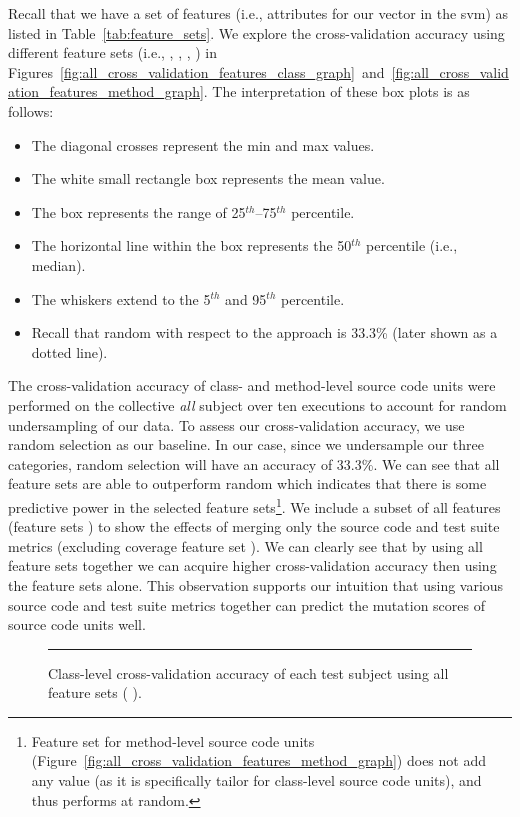 Recall that we have a set of features (i.e., attributes for our vector in the \gls{svm}) as listed in Table~\ref{tab:feature_sets}. We explore the cross-validation accuracy using different feature sets (i.e., , , , ) in Figures~\ref{fig:all_cross_validation_features_class_graph}~and~\ref{fig:all_cross_validation_features_method_graph}. The interpretation of these box plots is as follows:
\begin{itemize}
  \item The diagonal crosses represent the min and max values.
  \item The white small rectangle box represents the mean value.
  \item The box represents the range of 25$^{th}$--75$^{th}$ percentile.
  \item The horizontal line within the box represents the 50$^{th}$ percentile (i.e., median).
  \item The whiskers extend to the 5$^{th}$ and 95$^{th}$ percentile.
  \item Recall that random with respect to the approach is 33.3\% (later shown as a dotted line).
\end{itemize}
The cross-validation accuracy of class- and method-level source code units were performed on the collective \emph{all} subject over ten executions to account for random undersampling of our data. To assess our cross-validation accuracy, we use random selection as our baseline. In our case, since we undersample our three categories, random selection will have an accuracy of 33.3\%. We can see that all feature sets are able to outperform random which indicates that there is some predictive power in the selected feature sets\footnote{Feature set  for method-level source code units (Figure~\ref{fig:all_cross_validation_features_method_graph}) does not add any value (as it is specifically tailor for class-level source code units), and thus performs at random.}. We include a subset of all features (feature sets   ) to show the effects of merging only the source code and test suite metrics (excluding coverage feature set ). We can clearly see that by using all feature sets together we can acquire higher cross-validation accuracy then using the feature sets alone. This observation supports our intuition that using various source code and test suite metrics together can predict the mutation scores of source code units well.

\begin{figure}[!tb]
  \centering
  \begin{adjustbox}{max size={.95\textwidth}{.95\textheight}}
    
  \end{adjustbox}
  \caption{Class-level cross-validation accuracy of each test subject using all feature sets (   ).}
  \vspace{2mm}
  \hrule
  \label{fig:individual_cross_validation_class_1_2_3_4_graph}
\end{figure}

